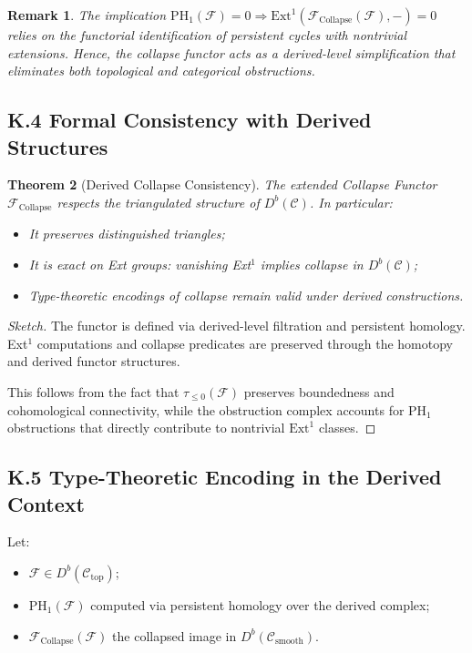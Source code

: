 \documentclass[11pt]{article}
\newtheorem{theorem}{Theorem}[section]
\newtheorem{remark}[theorem]{Remark}
\begin{document}
\begin{remark}
The implication \( \mathrm{PH}_1(\mathcal{F}) = 0 \Rightarrow \mathrm{Ext}^1(\mathcal{F}_{\mathrm{Collapse}}(\mathcal{F}), -) = 0 \)  
relies on the functorial identification of persistent cycles with nontrivial extensions.  
Hence, the collapse functor acts as a derived-level simplification that eliminates both topological and categorical obstructions.
\end{remark}


\subsection*{K.4 Formal Consistency with Derived Structures}

\begin{theorem}[Derived Collapse Consistency]
The extended Collapse Functor \( \mathcal{F}_{\mathrm{Collapse}} \) respects the triangulated structure of \( D^b(\mathcal{C}) \). In particular:

\begin{itemize}
    \item It preserves distinguished triangles;
    \item It is exact on Ext groups: vanishing Ext$^1$ implies collapse in \( D^b(\mathcal{C}) \);
    \item Type-theoretic encodings of collapse remain valid under derived constructions.
\end{itemize}
\end{theorem}

\begin{proof}[Sketch]
The functor is defined via derived-level filtration and persistent homology.  
Ext$^1$ computations and collapse predicates are preserved through the homotopy and derived functor structures.

This follows from the fact that \( \tau_{\leq 0}(\mathcal{F}) \) preserves boundedness and cohomological connectivity,  
while the obstruction complex accounts for PH$_1$ obstructions that directly contribute to nontrivial \( \mathrm{Ext}^1 \) classes.
\end{proof}


\subsection*{K.5 Type-Theoretic Encoding in the Derived Context}

Let:

\begin{itemize}
    \item \( \mathcal{F} \in D^b(\mathcal{C}_{\mathrm{top}}) \);
    \item \( \mathrm{PH}_1(\mathcal{F}) \) computed via persistent homology over the derived complex;
    \item \( \mathcal{F}_{\mathrm{Collapse}}(\mathcal{F}) \) the collapsed image in \( D^b(\mathcal{C}_{\mathrm{smooth}}) \).
\end{itemize}
\end{document}
